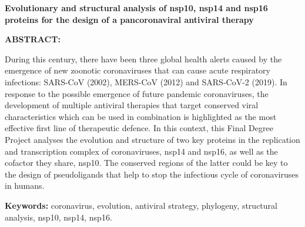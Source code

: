 \begin{center}
    
\Large\bfseries Evolutionary and structural analysis of nsp10, nsp14 and 
nsp16 proteins for the design of a pancoronaviral antiviral therapy

\end{center} 

\vspace{0.5cm}

\textbf {ABSTRACT:} 

During this century, there have been three global health alerts caused by 
the emergence of new zoonotic coronaviruses that can cause acute respiratory
infections: SARS-CoV (2002), MERS-CoV (2012) and SARS-CoV-2 (2019). In 
response to the possible emergence of future pandemic coronaviruses, the 
development of multiple antiviral therapies that target conserved viral 
characteristics which can be used in combination is highlighted as the most 
effective first line of therapeutic defence. In this context, this Final 
Degree Project analyses the evolution and structure of two key proteins in 
the replication and transcription complex of coronaviruses, nsp14 and nsp16,
as well as the cofactor they share, nsp10. The conserved regions of the latter
could be key to the design of pseudoligands that help to stop the infectious
cycle of coronaviruses in humans.

\vspace{0.5cm}

\textbf{Keywords:} coronavirus, evolution, antiviral strategy, 
phylogeny, structural analysis, nsp10, nsp14, nsp16.